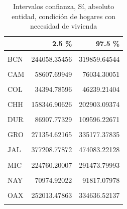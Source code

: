 \documentclass[
]{article}
\begin{document}
\begin{table}[H]

\caption{\label{tab:unnamed-chunk-20}Intervalos confianza, Sí, absoluto entidad, 
    condición de hogares con necesidad de vivienda}
\centering
\begin{tabular}[t]{lrr}
\toprule
  & 2.5 \% & 97.5 \%\\
\midrule
\cellcolor{gray!6}{AGU} & \cellcolor{gray!6}{53714.48931} & \cellcolor{gray!6}{69295.51069}\\
BCN & 244058.35456 & 319859.64544\\
\cellcolor{gray!6}{BCS} & \cellcolor{gray!6}{54232.39184} & \cellcolor{gray!6}{74513.60816}\\
CAM & 58607.69949 & 76034.30051\\
\cellcolor{gray!6}{COA} & \cellcolor{gray!6}{144132.45764} & \cellcolor{gray!6}{183745.54236}\\
\addlinespace
COL & 34394.78596 & 46239.21404\\
\cellcolor{gray!6}{CHP} & \cellcolor{gray!6}{352855.33125} & \cellcolor{gray!6}{448984.66875}\\
CHH & 158346.90626 & 202903.09374\\
\cellcolor{gray!6}{CMX} & \cellcolor{gray!6}{682494.39617} & \cellcolor{gray!6}{835747.60383}\\
DUR & 86907.77329 & 109596.22671\\
\addlinespace
\cellcolor{gray!6}{GUA} & \cellcolor{gray!6}{293215.79381} & \cellcolor{gray!6}{365048.20619}\\
GRO & 271354.62165 & 335177.37835\\
\cellcolor{gray!6}{HID} & \cellcolor{gray!6}{122637.61600} & \cellcolor{gray!6}{159216.38400}\\
JAL & 377208.77872 & 474083.22128\\
\cellcolor{gray!6}{MEX} & \cellcolor{gray!6}{772190.37168} & \cellcolor{gray!6}{994707.62832}\\
\addlinespace
MIC & 224760.20007 & 291473.79993\\
\cellcolor{gray!6}{MOR} & \cellcolor{gray!6}{97111.04709} & \cellcolor{gray!6}{121074.95291}\\
NAY & 70974.92022 & 91817.07978\\
\cellcolor{gray!6}{NLE} & \cellcolor{gray!6}{162207.95770} & \cellcolor{gray!6}{232598.04230}\\
OAX & 252013.47863 & 334636.52137\\
\addlinespace
\cellcolor{gray!6}{PUE} & \cellcolor{gray!6}{370239.07263} & \cellcolor{gray!6}{480156.92737}\\

\end{tabular}
\end{table}
\end{document}
